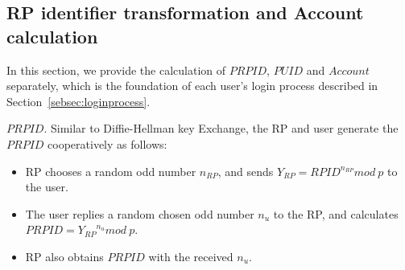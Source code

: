 \subsection{RP identifier transformation and Account calculation}
\label{subsec:identifier-generation}
In this section, we provide the calculation of $PRPID$, $PUID$ and $Account$ separately, which is the foundation of each user's login process described in Section~\ref{sebsec:loginprocess}.

{$PRPID$}. Similar to Diffie-Hellman key Exchange\cite{DiffieH76}, the RP and user generate the  $PRPID$ cooperatively as follows:
\begin{itemize}
  \item RP chooses a random odd number $n_{RP}$, and sends $Y_{RP} = {RPID}^{n_{RP}} mod \ p$ to the user.
  \item The user replies a random chosen odd number $n_{u}$ to the RP, and calculates $PRPID = {Y_{RP}}^{n_{u}} mod \ p$.
  \item RP also obtains $PRPID$ with the received $n_{u}$.
\end{itemize}


